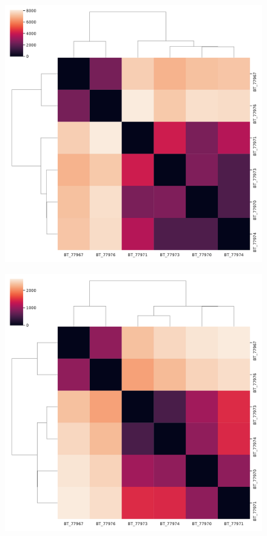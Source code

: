 \begin{figure}[ht]
  \centering
  \includegraphics[scale=0.35]{clusters/wasserstein_h1_bt.pdf}
  \caption{\label{fig:label} }
\end{figure}

\begin{figure}[ht]
  \centering
  \includegraphics[scale=0.35]{clusters/wasserstein_h2_bt.pdf}
  \caption{\label{fig:label} }
\end{figure}

